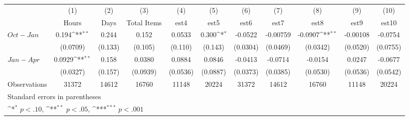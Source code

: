 {
\def\sym#1{\ifmmode^{#1}\else\(^{#1}\)\fi}
\begin{tabular}{l*{10}{c}}
\hline\hline
                    &\multicolumn{1}{c}{(1)}&\multicolumn{1}{c}{(2)}&\multicolumn{1}{c}{(3)}&\multicolumn{1}{c}{(4)}&\multicolumn{1}{c}{(5)}&\multicolumn{1}{c}{(6)}&\multicolumn{1}{c}{(7)}&\multicolumn{1}{c}{(8)}&\multicolumn{1}{c}{(9)}&\multicolumn{1}{c}{(10)}\\
                    &\multicolumn{1}{c}{Hours}&\multicolumn{1}{c}{Days}&\multicolumn{1}{c}{Total Items}&\multicolumn{1}{c}{est4}&\multicolumn{1}{c}{est5}&\multicolumn{1}{c}{est6}&\multicolumn{1}{c}{est7}&\multicolumn{1}{c}{est8}&\multicolumn{1}{c}{est9}&\multicolumn{1}{c}{est10}\\
\hline
$ Oct-Jan $         &       0.194\sym{**} &       0.244         &       0.152         &      0.0533         &       0.300\sym{*}  &     -0.0522         &    -0.00759         &     -0.0907\sym{**} &    -0.00108         &     -0.0754         \\
                    &    (0.0709)         &     (0.133)         &     (0.105)         &     (0.110)         &     (0.143)         &    (0.0304)         &    (0.0469)         &    (0.0342)         &    (0.0520)         &    (0.0755)         \\
[1em]
$ Jan-Apr $         &      0.0929\sym{**} &       0.158         &      0.0380         &      0.0884         &      0.0846         &     -0.0413         &     -0.0714         &     -0.0154         &      0.0247         &     -0.0677         \\
                    &    (0.0327)         &     (0.157)         &    (0.0939)         &    (0.0536)         &    (0.0887)         &    (0.0373)         &    (0.0385)         &    (0.0530)         &    (0.0536)         &    (0.0542)         \\
\hline
Observations        &       31372         &       14612         &       16760         &       11148         &       20224         &       31372         &       14612         &       16760         &       11148         &       20224         \\
\hline\hline
\multicolumn{11}{l}{\footnotesize Standard errors in parentheses}\\
\multicolumn{11}{l}{\footnotesize \sym{*} \(p<.10\), \sym{**} \(p<.05\), \sym{***} \(p<.001\)}\\
\end{tabular}
}
